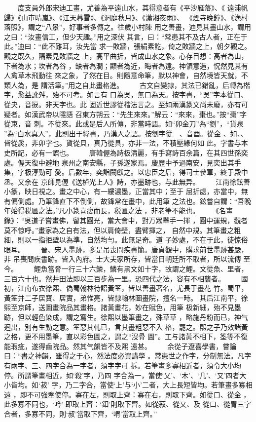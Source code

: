 \documentclass{ctexart}
\begin{document}
　　度支員外郎宋迪工畫，尤善為平遠山水，其得意者有《平沙雁落》、《 遠浦帆歸》《山市晴嵐》、《江天暮雪》、《洞庭秋月》、《瀟湘夜雨》、 《煙寺晚鐘》、《漁村落照》，謂之``八景''，好事者多傳之。往歲小村陳 用之善畫，迪見其畫山水，謂用之曰：``汝畫信工，但少天趣。''用之深伏 其言，曰：``常患其不及古人者，正在于此。''迪曰：``此不難耳，汝先當 求一敗牆，張絹素訖，倚之敗牆之上，朝夕觀之。觀之既久，隔素見敗牆之 上，高平曲折，皆成山水之象。心存目想：高者為山，下者為水；坎者為谷 ，缺者為澗；顯者為近，晦者為遠。神領意造，怳然見其有人禽草木飛動往 來之象，了然在目。則隨意命筆，默以神會，自然境皆天就，不類人為，是 謂活筆。''用之自此畫格進。 　　古文自變隸，其法已錯亂，后轉為楷字，愈益訛舛，殆不可考。如言有 口為吳，無口為天。按字書，``吳''字本從口、從夬，音捩。非天字也。此 固近世謬從楷法言之。至如兩漢篆文尚未廢，亦有可疑者。如漢武帝以隱語 召東方朔云：``先生來來。''解云：``來來，棗也。''按``棗''字從朿，音 刺。不從來。此或是后人所傳，非當時語。如``卯金刀''為``劉''，``貨泉 ''為``白水真人''，此則出于緯書，乃漢人之語。按劉字從　、音酉。從金 、如、、皆從扊，非卯字也。貨從貝，真乃從具，亦非一法，不積壓緣何如 此。字書与本史所記，必有一誤也。 　　唐韓偓為詩极清麗，有手寫詩百余篇，在其四世孫奕處。偓天復中避地 泉州之南安縣，子孫遂家焉。慶歷中予過南安，見奕出其手集，字极淳勁可 愛。后數年，奕詣闕獻之。以忠臣之后，得司士參軍，終于殿中丞。又余在 京師見偓《送栌光上人》詩，亦墨跡也，与此無异。 　　江南徐鉉善小篆，映日視之。畫之中心，有一縷濃墨，正當其中；至于 屈折處，亦當中，無有偏側處。乃筆鋒直下不倒側，故鋒常在畫中，此用筆 之法也。鉉嘗自謂：``吾晚年始得税匾之法。''凡小篆喜瘦而長，税匾之法 ，非老筆不能也。 　　《名畫錄》：``吳道子嘗畫佛，留其圓光，當大會中，對万眾舉手一揮 ，圓中運規，觀者莫不惊呼。''畫家為之自有法，但以肩倚壁，盡臂揮之， 自然中規。其筆畫之粗細，則以一指拒壁以為準，自然均勻。此無足奇。道 子妙處，不在于此，徒惊俗眼耳。 　　晉、宋人墨跡，多是吊喪問疾書簡。唐貞觀中，購求前世墨跡甚嚴，非 吊喪問疾書跡。皆入內府。士大夫家所存，皆當日朝廷所不取者，所以流傳 至今。 　　鯉魚當脅一行三十六鱗，鱗有黑文如十字，故謂之鯉。文從魚、里者， 三百六十也。然井田法即以三百步為一里。恐四代之法，容有不相襲者。 　　國初，江南布衣徐熙、偽蜀翰林待詔黃筌，皆以善畫著名，尤長于畫花 竹。蜀平，黃筌并二子居寶、居實，弟惟亮，皆隸翰林圖畫院，擅名一時。 其后江南平，徐熙至京師，送圖畫院品其畫格。諸黃畫花，妙在賦色，用筆 极新細，殆不見墨跡，但以輕色染成，謂之寫生。徐熙以墨筆畫之，殊草草 ，略施丹粉而已，神气迥出，別有生動之意。筌惡其軋已，言其畫粗惡不入 格，罷之。熙之子乃效諸黃之格，更不用墨筆，直以彩色圖之，謂之``沒骨 圖''。工与諸黃不相下，筌等不復能瑕疵，遂得齒院品。然其气韻皆不及熙 遠甚。 　　余從子遼喜學書，嘗論曰：``書之神韻，雖得之于心，然法度必資講學 。常患世之作字，分制無法。凡字有兩字、三、四字合為一字者，須字字可 拆。若筆畫多寡相近者，須令大小均停。所謂筆畫相近，如`殺'字，乃四 字合為一，當使`乂'、`木'、`几'、`又'四者大小皆均。如`菽' 字，乃二字合，當使`上'与`小'二者，大上長短皆均。若筆畫多寡相遠 ，即不可強牽使停。寡在左，則取上齊：寡在右，則取下齊。如從口、從金 ，此多寡不同也，`吟' 即取上齊：`釦'則取下齊。如從菽、從又、及 從口、從胃三字合者，多寡不同，則`叔'當取下齊，`喟'當取上齊。'' 
\end{document}
